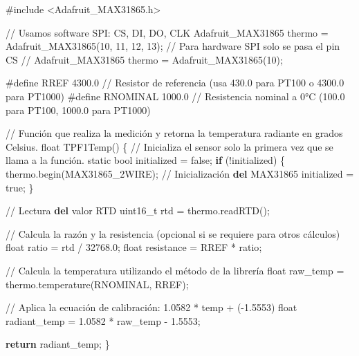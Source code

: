\documentclass[
  letterpaper,
]{scrbook}
\newenvironment{Shaded}{\begin{snugshade}}{\end{snugshade}}
\newcommand{\BuiltInTok}[1]{\textcolor[rgb]{0.00,0.23,0.31}{#1}}
\newcommand{\CommentTok}[1]{\textcolor[rgb]{0.37,0.37,0.37}{#1}}
\newcommand{\ControlFlowTok}[1]{\textcolor[rgb]{0.00,0.23,0.31}{\textbf{#1}}}
\newcommand{\DecValTok}[1]{\textcolor[rgb]{0.68,0.00,0.00}{#1}}
\newcommand{\FloatTok}[1]{\textcolor[rgb]{0.68,0.00,0.00}{#1}}
\newcommand{\KeywordTok}[1]{\textcolor[rgb]{0.00,0.23,0.31}{\textbf{#1}}}
\newcommand{\NormalTok}[1]{\textcolor[rgb]{0.00,0.23,0.31}{#1}}
\newcommand{\OperatorTok}[1]{\textcolor[rgb]{0.37,0.37,0.37}{#1}}
\begin{document}
\begin{Shaded}
\begin{Highlighting}[]
\CommentTok{\#include \textless{}Adafruit\_MAX31865.h\textgreater{}}

\OperatorTok{//}\NormalTok{ Usamos software SPI: CS, DI, DO, CLK}
\NormalTok{Adafruit\_MAX31865 thermo }\OperatorTok{=}\NormalTok{ Adafruit\_MAX31865(}\DecValTok{10}\NormalTok{, }\DecValTok{11}\NormalTok{, }\DecValTok{12}\NormalTok{, }\DecValTok{13}\NormalTok{)}\OperatorTok{;}
\OperatorTok{//}\NormalTok{ Para hardware SPI solo se pasa el pin CS}
\OperatorTok{//}\NormalTok{ Adafruit\_MAX31865 thermo }\OperatorTok{=}\NormalTok{ Adafruit\_MAX31865(}\DecValTok{10}\NormalTok{)}\OperatorTok{;}

\CommentTok{\#define RREF      4300.0  // Resistor de referencia (usa 430.0 para PT100 o 4300.0 para PT1000)}
\CommentTok{\#define RNOMINAL  1000.0  // Resistencia nominal a 0°C (100.0 para PT100, 1000.0 para PT1000)}

\OperatorTok{//}\NormalTok{ Función que realiza la medición y retorna la temperatura radiante en grados Celsius.}
\BuiltInTok{float}\NormalTok{ TPF1Temp() \{}
  \OperatorTok{//}\NormalTok{ Inicializa el sensor solo la primera vez que se llama a la función.}
\NormalTok{  static }\BuiltInTok{bool}\NormalTok{ initialized }\OperatorTok{=}\NormalTok{ false}\OperatorTok{;}
  \ControlFlowTok{if}\NormalTok{ (}\OperatorTok{!}\NormalTok{initialized) \{}
\NormalTok{    thermo.begin(MAX31865\_2WIRE)}\OperatorTok{;}  \OperatorTok{//}\NormalTok{ Inicialización }\KeywordTok{del}\NormalTok{ MAX31865}
\NormalTok{    initialized }\OperatorTok{=}\NormalTok{ true}\OperatorTok{;}
\NormalTok{  \}}
  
  \OperatorTok{//}\NormalTok{ Lectura }\KeywordTok{del}\NormalTok{ valor RTD}
\NormalTok{  uint16\_t rtd }\OperatorTok{=}\NormalTok{ thermo.readRTD()}\OperatorTok{;}
  
  \OperatorTok{//}\NormalTok{ Calcula la razón y la resistencia (opcional si se requiere para otros cálculos)}
  \BuiltInTok{float}\NormalTok{ ratio }\OperatorTok{=}\NormalTok{ rtd }\OperatorTok{/} \FloatTok{32768.0}\OperatorTok{;}
  \BuiltInTok{float}\NormalTok{ resistance }\OperatorTok{=}\NormalTok{ RREF }\OperatorTok{*}\NormalTok{ ratio}\OperatorTok{;}
  
  \OperatorTok{//}\NormalTok{ Calcula la temperatura utilizando el método de la librería}
  \BuiltInTok{float}\NormalTok{ raw\_temp }\OperatorTok{=}\NormalTok{ thermo.temperature(RNOMINAL, RREF)}\OperatorTok{;}

  \OperatorTok{//}\NormalTok{ Aplica la ecuación de calibración: }\FloatTok{1.0582} \OperatorTok{*}\NormalTok{ temp }\OperatorTok{+}\NormalTok{ (}\OperatorTok{{-}}\FloatTok{1.5553}\NormalTok{)}
  \BuiltInTok{float}\NormalTok{ radiant\_temp }\OperatorTok{=} \FloatTok{1.0582} \OperatorTok{*}\NormalTok{ raw\_temp }\OperatorTok{{-}} \FloatTok{1.5553}\OperatorTok{;}
  
  \ControlFlowTok{return}\NormalTok{ radiant\_temp}\OperatorTok{;}
\NormalTok{\}}
\end{Highlighting}
\end{Shaded}
\end{document}
